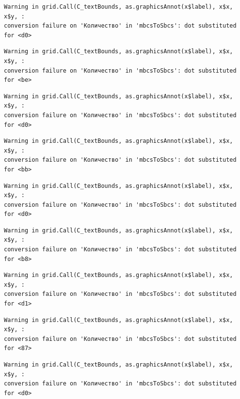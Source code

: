 \documentclass[
  letterpaper,
]{scrbook}
\theoremstyle{definition}
\theoremstyle{remark}
\begin{document}
\begin{verbatim}
Warning in grid.Call(C_textBounds, as.graphicsAnnot(x$label), x$x, x$y, :
conversion failure on 'Количество' in 'mbcsToSbcs': dot substituted for <d0>
\end{verbatim}

\begin{verbatim}
Warning in grid.Call(C_textBounds, as.graphicsAnnot(x$label), x$x, x$y, :
conversion failure on 'Количество' in 'mbcsToSbcs': dot substituted for <be>
\end{verbatim}

\begin{verbatim}
Warning in grid.Call(C_textBounds, as.graphicsAnnot(x$label), x$x, x$y, :
conversion failure on 'Количество' in 'mbcsToSbcs': dot substituted for <d0>
\end{verbatim}

\begin{verbatim}
Warning in grid.Call(C_textBounds, as.graphicsAnnot(x$label), x$x, x$y, :
conversion failure on 'Количество' in 'mbcsToSbcs': dot substituted for <bb>
\end{verbatim}

\begin{verbatim}
Warning in grid.Call(C_textBounds, as.graphicsAnnot(x$label), x$x, x$y, :
conversion failure on 'Количество' in 'mbcsToSbcs': dot substituted for <d0>
\end{verbatim}

\begin{verbatim}
Warning in grid.Call(C_textBounds, as.graphicsAnnot(x$label), x$x, x$y, :
conversion failure on 'Количество' in 'mbcsToSbcs': dot substituted for <b8>
\end{verbatim}

\begin{verbatim}
Warning in grid.Call(C_textBounds, as.graphicsAnnot(x$label), x$x, x$y, :
conversion failure on 'Количество' in 'mbcsToSbcs': dot substituted for <d1>
\end{verbatim}

\begin{verbatim}
Warning in grid.Call(C_textBounds, as.graphicsAnnot(x$label), x$x, x$y, :
conversion failure on 'Количество' in 'mbcsToSbcs': dot substituted for <87>
\end{verbatim}

\begin{verbatim}
Warning in grid.Call(C_textBounds, as.graphicsAnnot(x$label), x$x, x$y, :
conversion failure on 'Количество' in 'mbcsToSbcs': dot substituted for <d0>
\end{verbatim}
\end{document}
